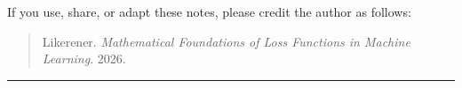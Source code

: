 \documentclass[11pt]{article}
\theoremstyle{definition}
\begin{document}
If you use, share, or adapt these notes, please credit the author as follows:

\begin{quote}
Likerener. \textit{Mathematical Foundations of Loss Functions in Machine Learning}. 2026.
\end{quote}

\bigskip
\hrule
\bigskip

\end{document}
